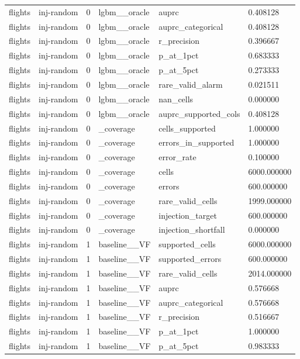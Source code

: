 \begin{tabular}{llllll}
flights & inj-random & 0 & lgbm\_\_oracle & auprc & 0.408128 \\
flights & inj-random & 0 & lgbm\_\_oracle & auprc\_categorical & 0.408128 \\
flights & inj-random & 0 & lgbm\_\_oracle & r\_precision & 0.396667 \\
flights & inj-random & 0 & lgbm\_\_oracle & p\_at\_1pct & 0.683333 \\
flights & inj-random & 0 & lgbm\_\_oracle & p\_at\_5pct & 0.273333 \\
flights & inj-random & 0 & lgbm\_\_oracle & rare\_valid\_alarm & 0.021511 \\
flights & inj-random & 0 & lgbm\_\_oracle & nan\_cells & 0.000000 \\
flights & inj-random & 0 & lgbm\_\_oracle & auprc\_supported\_cols & 0.408128 \\
flights & inj-random & 0 & \_coverage & cells\_supported & 1.000000 \\
flights & inj-random & 0 & \_coverage & errors\_in\_supported & 1.000000 \\
flights & inj-random & 0 & \_coverage & error\_rate & 0.100000 \\
flights & inj-random & 0 & \_coverage & cells & 6000.000000 \\
flights & inj-random & 0 & \_coverage & errors & 600.000000 \\
flights & inj-random & 0 & \_coverage & rare\_valid\_cells & 1999.000000 \\
flights & inj-random & 0 & \_coverage & injection\_target & 600.000000 \\
flights & inj-random & 0 & \_coverage & injection\_shortfall & 0.000000 \\
flights & inj-random & 1 & baseline\_\_VF & supported\_cells & 6000.000000 \\
flights & inj-random & 1 & baseline\_\_VF & supported\_errors & 600.000000 \\
flights & inj-random & 1 & baseline\_\_VF & rare\_valid\_cells & 2014.000000 \\
flights & inj-random & 1 & baseline\_\_VF & auprc & 0.576668 \\
flights & inj-random & 1 & baseline\_\_VF & auprc\_categorical & 0.576668 \\
flights & inj-random & 1 & baseline\_\_VF & r\_precision & 0.516667 \\
flights & inj-random & 1 & baseline\_\_VF & p\_at\_1pct & 1.000000 \\
flights & inj-random & 1 & baseline\_\_VF & p\_at\_5pct & 0.983333 \\

\end{tabular}

